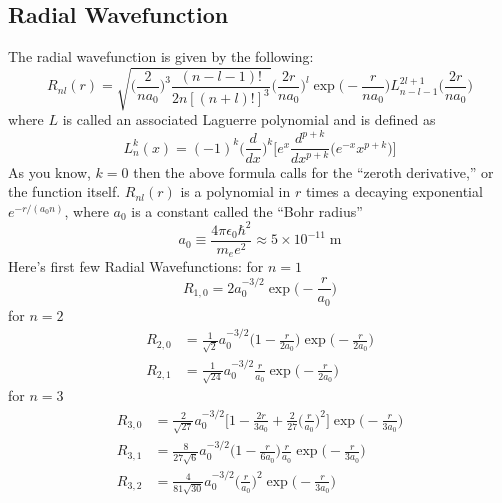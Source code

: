 \documentclass[../../main.tex]{subfiles}
\begin{document}
\subsection{Radial Wavefunction}
The radial wavefunction is given by the following:
\begin{equation*}
    R_{nl}(r)=\sqrt{ \bigg(\frac{2}{na_0}\bigg)^3 \frac{(n - l - 1)!}{2n[(n + l)! ]^3}} \bigg(\frac{2r}{na_0}\bigg)^l \exp \biggl( - \frac{r}{na_0} \biggr) L_{n-l-1}^{2l+1}\biggl(\frac{2r}{na_0}\biggr)
\end{equation*}
where $L$ is called an associated Laguerre polynomial and is defined as
\begin{equation*}
    L_n^{k}(x) =(-1)^k\biggl(\frac{d}{dx}\biggr)^k\biggl[ e^x \frac{d^{p+k}}{dx^{p+k}}\bigl(e^{-x}x^{p+k}\bigr) \biggr]
\end{equation*}
As you know,  $k = 0$ then the above formula calls for the “zeroth derivative,” or the function itself. $ R_{nl}(r)$ is a polynomial in $r$ times a decaying exponential $e^{-r/(a_0n)}$, where $a_0$ is a constant called the “Bohr radius”
\begin{equation*}
    a_0\equiv \frac{4\pi \epsilon_0\hbar^2}{m_e e^2}\approx 5 \times 10^{-11} \;\text{m}
\end{equation*}
Here's first few Radial Wavefunctions: for $n=1$
\begin{equation*}
    R_{1,0}=2a_0^{-3/2}\exp \biggl(-\frac{r}{a_0}\biggr)
\end{equation*}
for $n=2$
\begin{align*}
    R_{2,0}&=\frac{1}{\sqrt{2}}a_0^{-3/2}\biggl(1-\frac{r}{2a_0}\biggr) \exp \biggl(-\frac{r}{2a_0}\biggr)\\
    R_{2,1}&=\frac{1}{\sqrt{24}}a_0^{-3/2} \frac{r}{a_0} \exp \biggl(-\frac{r}{2a_0}\biggr)
\end{align*}
for $n=3$
\begin{align*}
    R_{3,0}&=\frac{2}{\sqrt{27}} a_0^{-3/2} \biggl[1-\frac{2r}{3a_0}+\frac{2}{27}\biggl(\frac{r}{a_0}\biggr)^2 \biggr] \exp \biggl(-\frac{r}{3a_0}\biggr)\\
    R_{3,1}&=\frac{8}{27\sqrt{6}} a_0^{-3/2} \biggl(1-\frac{r}{6a_0}\biggr)\frac{r}{a_0} \exp \biggl(-\frac{r}{3a_0}\biggr)\\
    R_{3,2}&=\frac{4}{81\sqrt{30}} a_0^{-3/2} \biggl(\frac{r}{a_0}\biggr)^2 \exp \biggl(-\frac{r}{3a_0}\biggr)\\
\end{align*}
\end{document}
